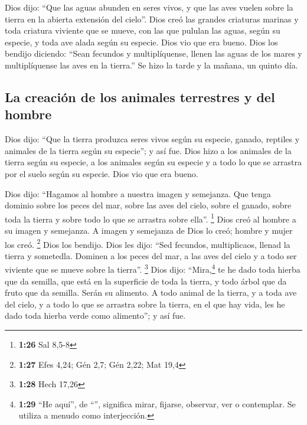 \begin{paracol}{2}
 Dios dijo: ``Que las aguas abunden en seres vivos, y que
las aves vuelen sobre la tierra en la abierta extensión del cielo''.
 Dios creó las grandes criaturas marinas y toda criatura
viviente que se mueve, con las que pululan las aguas, según su especie,
y toda ave alada según su especie. Dios vio que era bueno.
 Dios los bendijo diciendo: ``Sean fecundos y
multiplíquense, llenen las aguas de los mares y multiplíquense las aves
en la tierra.''  Se hizo la tarde y la mañana, un quinto
día.

\hypertarget{la-creaciuxf3n-de-los-animales-terrestres-y-del-hombre}{%
\subsection{La creación de los animales terrestres y del
hombre}\label{la-creaciuxf3n-de-los-animales-terrestres-y-del-hombre}}

 Dios dijo: ``Que la tierra produzca seres vivos según su
especie, ganado, reptiles y animales de la tierra según su especie''; y
así fue.  Dios hizo a los animales de la tierra según su
especie, a los animales según su especie y a todo lo que se arrastra por
el suelo según su especie. Dios vio que era bueno.

 Dios dijo: ``Hagamos al hombre a nuestra imagen y
semejanza. Que tenga dominio sobre los peces del mar, sobre las aves del
cielo, sobre el ganado, sobre toda la tierra y sobre todo lo que se
arrastra sobre ella''. \footnote{\textbf{1:26} Sal 8,5-8}
 Dios creó al hombre a su imagen y semejanza. A imagen y
semejanza de Dios lo creó; hombre y mujer los creó. \footnote{\textbf{1:27}
  Efes 4,24; Gén 2,7; Gén 2,22; Mat 19,4}  Dios los
bendijo. Dios les dijo: ``Sed fecundos, multiplicaos, llenad la tierra y
sometedla. Dominen a los peces del mar, a las aves del cielo y a todo
ser viviente que se mueve sobre la tierra''. \footnote{\textbf{1:28}
  Hech 17,26}  Dios dijo: ``Mira,\footnote{\textbf{1:29}
  ``He aquí'', de ``'', significa mirar, fijarse, observar,
  ver o contemplar. Se utiliza a menudo como interjección.} te he dado
toda hierba que da semilla, que está en la superficie de toda la tierra,
y todo árbol que da fruto que da semilla. Serán su alimento.
 A todo animal de la tierra, y a toda ave del cielo, y a
todo lo que se arrastra sobre la tierra, en el que hay vida, les he dado
toda hierba verde como alimento''; y así fue.


\end{paracol}
